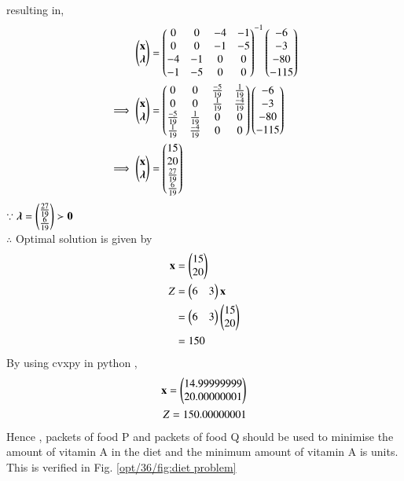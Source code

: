     resulting in,
    \begin{align}
        \begin{pmatrix}\mathbf{x} \\ \boldsymbol{\lambda}\end{pmatrix} &= \begin{pmatrix}0 & 0 & -4 & -1 \\ 0 & 0 & -1 & -5 \\ -4 & -1 & 0 & 0 \\ -1 & -5 & 0 & 0\end{pmatrix}^{-1}\begin{pmatrix}-6 \\ -3 \\ -80 \\ -115\end{pmatrix}
        \\
        \implies   \begin{pmatrix}\mathbf{x} \\ \boldsymbol{\lambda}\end{pmatrix} &= \begin{pmatrix}0 & 0 & \frac{-5}{19} & \frac{1}{19} \\ 0 & 0 & \frac{1}{19} & \frac{-4}{19} \\ \frac{-5}{19} & \frac{1}{19} & 0 & 0 \\ \frac{1}{19} & \frac{-4}{19} & 0 & 0\end{pmatrix}\begin{pmatrix}-6 \\ -3 \\ -80 \\ -115\end{pmatrix}
        \\
        \implies \begin{pmatrix}\mathbf{x} \\ \boldsymbol{\lambda}\end{pmatrix} &= \begin{pmatrix}15 \\ 20 \\ \frac{27}{19} \\ \frac{6}{19} \end{pmatrix}
    \end{align}
    $\because \boldsymbol{\lambda}=\begin{pmatrix}\frac{27}{19} \\ \frac{6}{19}\end{pmatrix} \succ \mathbf{0} $
    \\
    $\therefore$ Optimal solution is given by
    \begin{align}
        \mathbf{x} &= \begin{pmatrix}15\\20\end{pmatrix} \\
        Z &= \begin{pmatrix}6 & 3\end{pmatrix}\mathbf{x} \\
        &= \begin{pmatrix}6 & 3\end{pmatrix}\begin{pmatrix}15 \\ 20\end{pmatrix} \\
        &= 150
    \end{align}
    By using cvxpy in python ,
    \begin{align}
        \mathbf{x}=\begin{pmatrix}14.99999999\\20.00000001\end{pmatrix}\\
        Z = 150.00000001
    \end{align}
    Hence , packets of food P and  packets of food Q should be used to minimise the amount of vitamin A in the diet and the minimum amount of vitamin A is  units.  This is verified in Fig. \ref{opt/36/fig:diet problem}	
